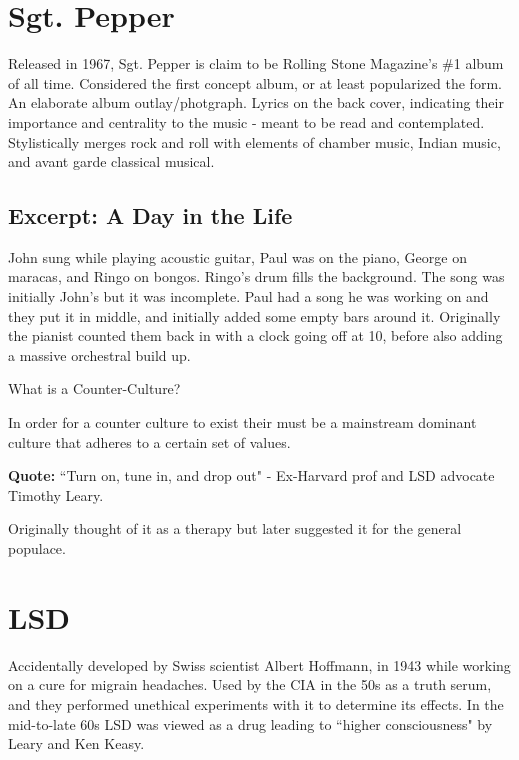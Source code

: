 \documentclass[12pt, a4paper, twoside, openright, titlepage]{book}
\begin{document}
\section{Sgt. Pepper}

Released in 1967, Sgt. Pepper is claim to be Rolling Stone Magazine's \#1 album of all time. Considered the first concept album, or at least popularized the form. An elaborate album outlay/photgraph. Lyrics on the back cover, indicating their importance and centrality to the music - meant to be read and contemplated. Stylistically merges rock and roll with elements of chamber music, Indian music, and avant garde classical musical.

\subsection{Excerpt: A Day in the Life}

John sung while playing acoustic guitar, Paul was on the piano, George on maracas, and Ringo on bongos. Ringo's drum fills the background. The song was initially John's but it was incomplete. Paul had a song he was working on and they put it in middle, and initially added some empty bars around it. Originally the pianist counted them back in with a clock going off at 10, before also adding a massive orchestral build up.


\begin{qst}{}{}
    What is a Counter-Culture?
\end{qst}

In order for a counter culture to exist their must be a mainstream dominant culture that adheres to a certain set of values.

\textbf{Quote:} ``Turn on, tune in, and drop out" - Ex-Harvard prof and LSD advocate Timothy Leary. 

Originally thought of it as a therapy but later suggested it for the general populace.


\section{LSD}

Accidentally developed by Swiss scientist Albert Hoffmann, in 1943 while working on a cure for migrain headaches. Used by the CIA in the 50s as a truth serum, and they performed unethical experiments with it to determine its effects. In the mid-to-late 60s LSD was viewed as a drug leading to ``higher consciousness" by Leary and Ken Keasy.
\end{document}
